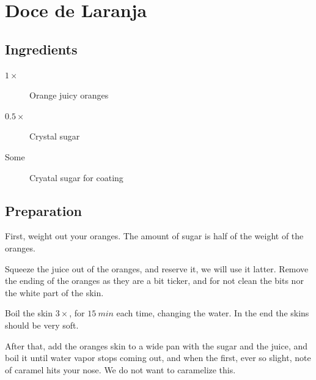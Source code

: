 \setchapterpreamble[u]{\margintoc}
\chapter{Doce de Laranja}\label{doce de laranja}

\section{Ingredients}

\begin{multicols}{2}
	\begin{description}
		\item[$1\times$] Orange juicy oranges
		\item[$0.5\times$] Crystal sugar
		\item[Some] Cryatal sugar for coating
	\end{description}
\end{multicols}	

\section{Preparation}
First, weight out your oranges. The amount of sugar is half of the weight of the oranges.

Squeeze the juice out of the oranges, and reserve it, we will use it latter. Remove the ending of the oranges as they are a bit ticker, and for not clean the bits nor the white part of the skin.

Boil the skin $3\times$, for $15~min$ each time, changing the water. In the end the skins should be very soft.

After that, add the oranges skin to a wide pan with the sugar and the juice, and boil it until water vapor stops coming out, and when the first, ever so slight, note of caramel hits your nose. We do not want to caramelize this.

